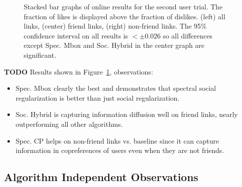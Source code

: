 \begin{figure}[t!]
\caption{Stacked bar graphs of online results for the second
user trial.  The fraction of likes is displayed above 
the fraction of dislikes.  (left) all links, (center) friend links,
(right) non-friend links. The 95\% confidence interval on all 
results is $< \pm 0.026$ so all differences except Spec. Mbox
and Soc. Hybrid in the center graph are significant. }
\label{fig:online2}
\end{figure}

{\bf TODO} 
Results shown in Figure~\ref{fig:online2}, observations:
\begin{itemize}
\item Spec. Mbox clearly the best and demonstrates that spectral social 
regularization is better than just social regularization.
\item Soc. Hybrid is capturing information diffusion well on friend links, 
nearly outperforming all other algorithms.
\item Spec. CP helps on non-friend links vs. baseline since it can capture 
information in copreferences of users even when they are not friends.
\end{itemize}


\subsection{Algorithm Independent Observations}

